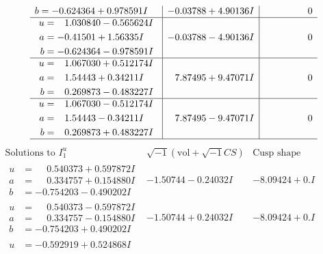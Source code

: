 \documentclass[1p]{elsarticle_modified}
\theoremstyle{definition}
\newcommand{\I}{\sqrt{-1}}
\begin{document}
$$\begin{array}{c|c|c}
\begin{aligned}
b &= -0.624364 + 0.978591 I\end{aligned}
 & -0.03788 + 4.90136 I & \phantom{-0.000000 } 0 \\ \hline\begin{aligned}
u &= \phantom{-}1.030840 - 0.565624 I \\
a &= -0.41501 + 1.56335 I \\
b &= -0.624364 - 0.978591 I\end{aligned}
 & -0.03788 - 4.90136 I & \phantom{-0.000000 } 0 \\ \hline\begin{aligned}
u &= \phantom{-}1.067030 + 0.512174 I \\
a &= \phantom{-}1.54443 + 0.34211 I \\
b &= \phantom{-}0.269873 - 0.483227 I\end{aligned}
 & \phantom{-}7.87495 + 9.47071 I & \phantom{-0.000000 } 0 \\ \hline\begin{aligned}
u &= \phantom{-}1.067030 - 0.512174 I \\
a &= \phantom{-}1.54443 - 0.34211 I \\
b &= \phantom{-}0.269873 + 0.483227 I\end{aligned}
 & \phantom{-}7.87495 - 9.47071 I & \phantom{-0.000000 } 0\\
 \hline 
 \end{array}$$\newpage$$\begin{array}{c|c|c}  
\text{Solutions to }I^u_{1}& \I (\text{vol} + \sqrt{-1}CS) & \text{Cusp shape}\\
 \hline 
\begin{aligned}
u &= \phantom{-}0.540373 + 0.597872 I \\
a &= \phantom{-}0.334757 + 0.154880 I \\
b &= -0.754203 - 0.490202 I\end{aligned}
 & -1.50744 - 0.24032 I & -8.09424 + 0. I\phantom{ +0.000000I} \\ \hline\begin{aligned}
u &= \phantom{-}0.540373 - 0.597872 I \\
a &= \phantom{-}0.334757 - 0.154880 I \\
b &= -0.754203 + 0.490202 I\end{aligned}
 & -1.50744 + 0.24032 I & -8.09424 + 0. I\phantom{ +0.000000I} \\ \hline\begin{aligned}
u &= -0.592919 + 0.524868 I \\

\end{aligned}
\end{array}$$
\end{document}
